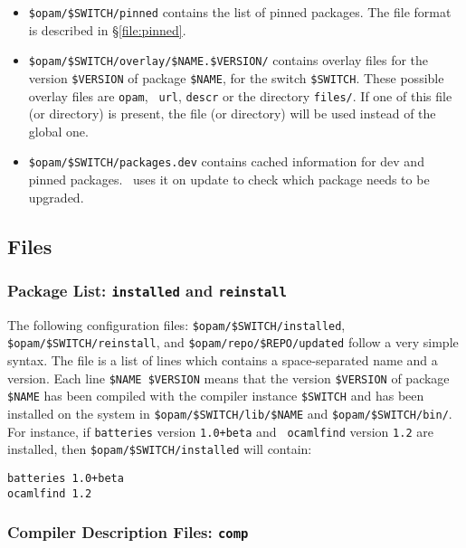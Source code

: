 \documentclass[a4paper,10pt]{article}
\begin{document}
\begin{itemize}
\item \verb+$opam/$SWITCH/pinned+ contains the list of pinned
  packages. The file format is described in \S\ref{file:pinned}.

\item \verb+$opam/$SWITCH/overlay/$NAME.$VERSION/+ contains overlay
  files for the version \verb+$VERSION+ of package \verb+$NAME+, for the
  switch \verb+$SWITCH+. These possible overlay files are {\tt opam}, {\tt
    url}, {\tt descr} or the directory {\tt files/}. If one of this
  file (or directory) is present, the file (or directory) will be used
  instead of the global one.

\item \verb+$opam/$SWITCH/packages.dev+ contains cached information
  for dev and pinned packages. \OPAM\ uses it on update to check which
  package needs to be upgraded.

\end{itemize}

\subsection{Files}

\subsubsection{Package List: {\tt installed} and {\tt reinstall}}
\label{file:installed}

The following configuration files: \verb+$opam/$SWITCH/installed+,
\verb+$opam/$SWITCH/reinstall+, and \verb+$opam/repo/$REPO/updated+
follow a very simple syntax. The file is a list of lines which
contains a space-separated name and a version. Each line
\verb+$NAME $VERSION+ means that the version \verb+$VERSION+ of
package \verb+$NAME+ has been compiled with the compiler instance
\verb+$SWITCH+ and has been installed on the system in
\verb+$opam/$SWITCH/lib/$NAME+ and \verb+$opam/$SWITCH/bin/+. \\

For instance, if {\tt batteries} version {\tt 1.0+beta} and {\tt
  ocamlfind} version {\tt 1.2} are installed, then
\verb+$opam/$SWITCH/installed+ will contain:

{\small
\begin{Verbatim}[frame=single]
batteries 1.0+beta
ocamlfind 1.2
\end{Verbatim}
}

\subsubsection{Compiler Description Files: {\tt comp}}
\label{file:comp}
\end{document}
